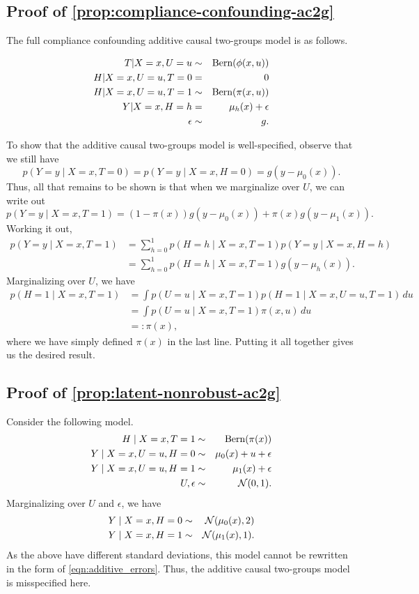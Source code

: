 \subsection{Proof of \cref{prop:compliance-confounding-ac2g}}

The full compliance confounding additive causal two-groups model is as follows.

\begin{align*}
T |  X=x, U=u &\sim& \textnormal{Bern}(\phi(x,u))  \\
H | X=x, U=u, T=0 &=& 0  \\
H | X=x, U=u, T=1 &\sim& \textnormal{Bern}(\pi(x,u))  \\
Y | X=x, H=h &=& \mu_{h}(x) + \epsilon  \\
\epsilon &\sim& g.
\end{align*}

To show that the additive causal two-groups model is well-specified, observe that we still have
\[ p(Y = y \mid X=x, T=0 ) 
= p(Y = y \mid X=x, H=0 ) 
=  {g}(y - {\mu}_0(x)). \]
Thus, all that remains to be shown is that when we marginalize over $U$, we can write out
\[ p(Y = y \mid X=x, T=1) =  (1-\pi(x)) {g}(y - {\mu}_0(x)) + \pi(x) {g}(y - \mu_1(x)) .\]
Working it out,
\begin{align*}
p(Y = y \mid X=x, T=1) &= \sum_{h =0}^1 p(H=h \mid X=x, T=1) p(Y = y \mid X=x, H=h) \\
&= \sum_{h =0}^1 p(H=h \mid X=x, T=1) g(y - \mu_h(x)).
\end{align*}
Marginalizing over $U$, we have
\begin{align*}
p(H=1 \mid X=x, T=1) &= \int p(U = u \mid X=x, T=1) p(H = 1 \mid X=x, U=u, T=1) \, du \\
&= \int p(U = u \mid X=x, T=1) \pi(x,u) \, du \\
&=: \pi(x),
\end{align*}
where we have simply defined $\pi(x)$ in the last line. Putting it all together gives us the desired result.


\subsection{Proof of \cref{prop:latent-nonrobust-ac2g}}

Consider the following model.
\begin{align*}
H \mid X=x, T=1 &\sim& \textnormal{Bern}(\pi(x)) \\ 
Y \mid X=x, U=u, H=0 &\sim& \mu_0(x) + u + \epsilon \\ 
Y \mid X=x, U=u, H=1 &\sim& \mu_1(x) + \epsilon \\ 
U, \epsilon &\sim& \mathcal{N}(0,1).
\end{align*}
Marginalizing over $U$ and $\epsilon$, we have
\begin{align*}
Y \mid X=x, H=0 &\sim& \mathcal{N}(\mu_0(x),2) \\ 
Y \mid X=x, H=1 &\sim& \mathcal{N}(\mu_1(x),1).
\end{align*}
As the above have different standard deviations, this model cannot be rewritten in the form of \cref{eqn:additive_errors}. Thus, the additive causal two-groups model is misspecified here.